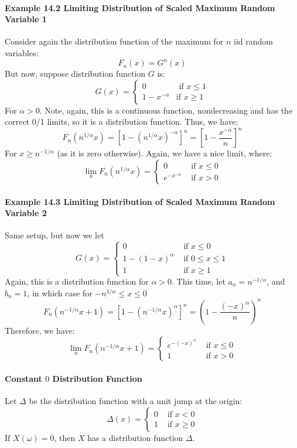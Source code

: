 \documentclass[12pt,a4paper]{article}
\newcommand{\1}[1]{\mathbbm{1}\left\{ #1 \right\}}
\begin{document}
\paragraph{Example 14.2 Limiting Distribution of Scaled Maximum Random Variable 1} Consider again the distribution function of the maximum for $n$ iid random variables:
$$
	F_n(x) = G^n(x)
$$
But now, suppose distribution function $G$ is:
$$
	G(x) =
	\begin{cases}
	0 & \text{ if $x \leq 1$}\\
	1 - x^{-\alpha} & \text{if $x \geq 1$}
	\end{cases}
$$
For $\alpha > 0$. Note, again, this is a continuous function, nondecreasing and has the correct 0/1 limits, so it is a distribution function. Thus, we have:
$$
	F_n(n^{1/\alpha}x) = \left[1-(n^{1/\alpha}x)^{-\alpha}\right]^n =
	\left[1 - \frac{x^{-\alpha}}{n}\right]^n
$$
For $x \geq n^{-1/\alpha}$ (as it is zero otherwise). Again, we have a nice limit, where:
$$
	\lim_n F_n(n^{1/\alpha}x) =
	\begin{cases}
	0 & \text{ if $x \leq 0$}\\
	e^{-x^{-\alpha}} & \text{ if $x > 0$}
	\end{cases}
$$

\paragraph{Example 14.3 Limiting Distribution of Scaled Maximum Random Variable 2} Same setup, but now we let 
$$
	G(x) =
	\begin{cases}
	0 & \text{ if $x \leq 0$}\\
	1 - (1-x)^\alpha & \text{ if $0 \leq x \leq 1$}\\
	1 & \text{ if $x \geq 1$}
	\end{cases}
$$
Again, this is a distribution function for $\alpha > 0$. This time, let $a_n = n^{-1/\alpha}$, and $b_n = 1$, in which case for $-n^{1/\alpha} \leq x \leq 0$
$$
	F_n(n^{-1/\alpha}x + 1) = 
	\left[1 - (n^{-1/\alpha}x)^\alpha\right]^n =
	\left(1 - \frac{(-x)^\alpha}{n}\right)^n
$$
Therefore, we have:
$$
	\lim_n F_n(n^{-1/\alpha}x + 1) =
	\begin{cases}
	e^{-(-x)^\alpha} & \text{ if $x \leq 0$}\\
	1 & \text{ if $x > 0$}
	\end{cases}
$$

\paragraph{Constant $0$ Distribution Function} Let $\Delta$ be the distribution function with a unit jump at the origin:
$$
	\Delta(x) = 
	\begin{cases}
	0 & \text{ if $x < 0$}\\
	1 & \text{ if $x \geq 0$}
	\end{cases}
$$
If $X(\omega) = 0$, then $X$ has a distribution function $\Delta$.
\end{document}
